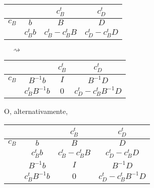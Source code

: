 \documentclass[11pt]{report}
\theoremstyle{mytheorem}
\theoremstyle{mydefinition}
\theoremstyle{myexample}
\begin{document}
\begin{center}
\begin{tabular}{|c|c|c|c|}
    \cline{3-4}
    \multicolumn{1}{c}{} & \multicolumn{1}{c|}{} & \multicolumn{1}{c}{$c_B^t$} & \multicolumn{1}{c|}{$c_D^t$} \\ \hline
    
    $c_B$ & $b$ & \multicolumn{1}{c}{$B$} & \multicolumn{1}{c|}{$D$} \\ \hline
    
    \multicolumn{1}{c|}{} & $c_B^tb$ & \multicolumn{1}{c}{$c_B^t-c_B^tB$} & \multicolumn{1}{c|}{$c_D^t-c_B^tD$} \\
    \cline{2-4}
\end{tabular} $\quad \rightsquigarrow \quad$ 
\begin{tabular}{|c|c|c|c|}
    \cline{3-4}
    \multicolumn{1}{c}{} & \multicolumn{1}{c|}{} & \multicolumn{1}{c}{$c_B^t$} & \multicolumn{1}{c|}{$c_D^t$} \\ \hline
    
    $c_B$ & $B^{-1}b$ & \multicolumn{1}{c}{$I$} & \multicolumn{1}{c|}{$B^{-1}D$} \\ \hline
    
    \multicolumn{1}{c|}{} & $c_B^tB^{-1}b$ & \multicolumn{1}{c}{$0$} & \multicolumn{1}{c|}{$c_D^t-c_B^tB^{-1}D$} \\
    \cline{2-4}
\end{tabular}
\end{center}
O, alternativamente,
\begin{center}
\begin{tabular}{|c|c|c|c|}
    \cline{3-4}
    \multicolumn{1}{c}{} & \multicolumn{1}{c|}{} & \multicolumn{1}{c}{$c_B^t$} & \multicolumn{1}{c|}{$c_D^t$} \\ \hline
    
    $c_B$ & $b$ & \multicolumn{1}{c}{$B$} & \multicolumn{1}{c|}{$D$} \\ \hline
    
    \multicolumn{1}{c|}{} & $c_B^tb$ & \multicolumn{1}{c}{$c_B^t-c_B^tB$} & \multicolumn{1}{c|}{$c_D^t-c_B^tD$} \\
    \hhline{~|=|=|=|}
    
    \multicolumn{1}{c|}{} & $B^{-1}b$ & \multicolumn{1}{c}{$I$} & \multicolumn{1}{c|}{$B^{-1}D$} \\ \cline{2-4}
    
    \multicolumn{1}{c|}{} & $c_B^tB^{-1}b$ & \multicolumn{1}{c}{$0$} & \multicolumn{1}{c|}{$c_D^t-c_B^tB^{-1}D$} \\
    \cline{2-4}
\end{tabular}
\end{center}
\end{document}
